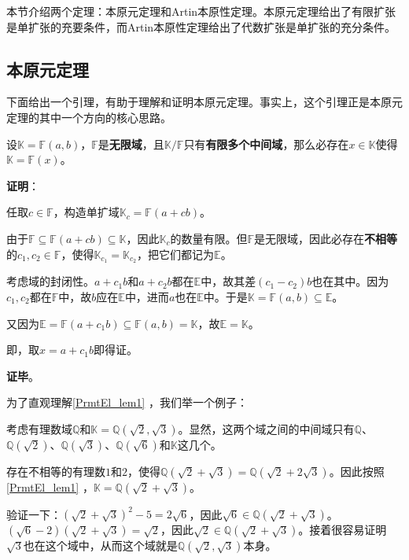 


本节介绍两个定理：本原元定理和Artin本原性定理。本原元定理给出了有限扩张是单扩张的充要条件，而Artin本原性定理给出了代数扩张是单扩张的充分条件。

\subsection{本原元定理}

下面给出一个引理，有助于理解和证明本原元定理。事实上，这个引理正是本原元定理的其中一个方向的核心思路。


\begin{lemma}{}\label{PrmtEl_lem1}
设$\mathbb{K}=\mathbb{F}(a, b)$，$\mathbb{F}$是\textbf{无限域}，且$\mathbb{K}/\mathbb{F}$只有\textbf{有限多个中间域}，那么必存在$x\in\mathbb{K}$使得$\mathbb{K}=\mathbb{F}(x)$。
\end{lemma}

\textbf{证明}：

任取$c\in\mathbb{F}$，构造单扩域$\mathbb{K}_c=\mathbb{F}(a+cb)$。

由于$\mathbb{F}\subseteq\mathbb{F}(a+cb)\subseteq\mathbb{K}$，因此$\mathbb{K}_c$的数量有限。但$\mathbb{F}$是无限域，因此必存在\textbf{不相等}的$c_1, c_2\in\mathbb{F}$，使得$\mathbb{K}_{c_1}=\mathbb{K}_{c_2}$，把它们都记为$\mathbb{E}$。

考虑域的封闭性。$a+c_1b$和$a+c_2b$都在$\mathbb{E}$中，故其差$(c_1-c_2)b$也在其中。因为$c_1, c_2$都在$\mathbb{F}$中，故$b$应在$\mathbb{E}$中，进而$a$也在$\mathbb{E}$中。于是$\mathbb{K}=\mathbb{F}(a, b)\subseteq\mathbb{E}$。

又因为$\mathbb{E}=\mathbb{F}(a+c_1b)\subseteq\mathbb{F}(a, b)=\mathbb{K}$，故$\mathbb{E}=\mathbb{K}$。

即，取$x=a+c_1b$即得证。

\textbf{证毕}。


为了直观理解\autoref{PrmtEl_lem1} ，我们举一个例子：

\begin{example}{}

考虑有理数域$\mathbb{Q}$和$\mathbb{K}=\mathbb{Q}(\sqrt{2}, \sqrt{3})$。显然，这两个域之间的中间域只有$\mathbb{Q}$、$\mathbb{Q}(\sqrt{2})$、$\mathbb{Q}(\sqrt{3})$、$\mathbb{Q}(\sqrt{6})$和$\mathbb{K}$这几个。

存在不相等的有理数$1$和$2$，使得$\mathbb{Q}(\sqrt{2}+\sqrt{3})=\mathbb{Q}(\sqrt{2}+2\sqrt{3})$。因此按照\autoref{PrmtEl_lem1} ，$\mathbb{K}=\mathbb{Q}(\sqrt{2}+\sqrt{3})$。

验证一下：$(\sqrt{2}+\sqrt{3})^2-5=2\sqrt{6}$，因此$\sqrt{6}\in\mathbb{Q}(\sqrt{2}+\sqrt{3})$。$(\sqrt{6}-2)(\sqrt{2}+\sqrt{3})=\sqrt{2}$，因此$\sqrt{2}\in\mathbb{Q}(\sqrt{2}+\sqrt{3})$。接着很容易证明$\sqrt{3}$也在这个域中，从而这个域就是$\mathbb{Q}(\sqrt{2}, \sqrt{3})$本身。

\end{example}


